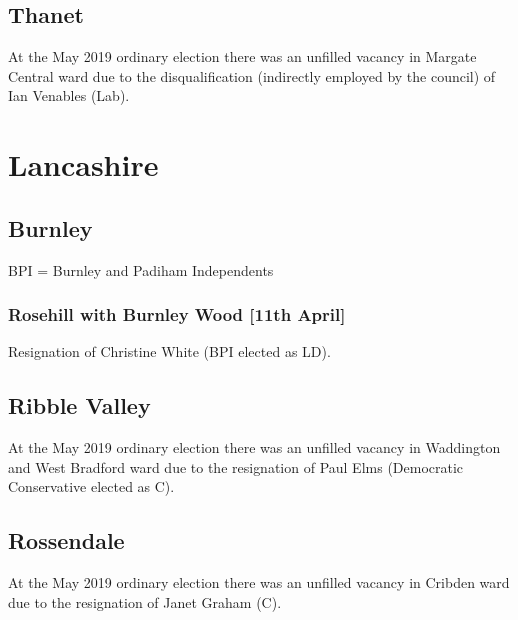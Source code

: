 \documentclass[a4paper,openany]{book}
\begin{document}
\begin{resultsiii}
\subsection*{Thanet}

At the May 2019 ordinary election there was an unfilled vacancy in Margate Central ward due to the disqualification (indirectly employed by the council) of Ian Venables (Lab).

\section{Lancashire}

\subsection*{Burnley}

BPI = Burnley and Padiham Independents

\subsubsection*{Rosehill with Burnley Wood \hspace*{\fill}\nolinebreak[1]%
	\enspace\hspace*{\fill}
	[11th April]}


Resignation of Christine White (BPI elected as LD).

\subsection*{Ribble Valley}

At the May 2019 ordinary election there was an unfilled vacancy in Waddington and West Bradford ward due to the resignation of Paul Elms (Democratic Conservative elected as C).

\subsection*{Rossendale}

At the May 2019 ordinary election there was an unfilled vacancy in Cribden ward due to the resignation of Janet Graham (C).


\end{resultsiii}
\end{document}
